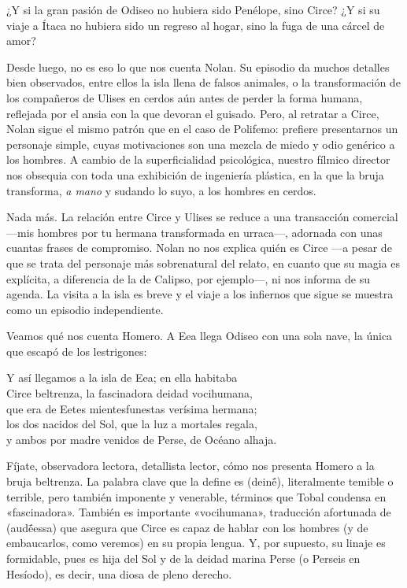 \label{cap:circe}

¿Y si la gran pasión de Odiseo no hubiera sido Penélope, sino Circe? ¿Y si su viaje a Ítaca no hubiera sido un regreso al hogar, sino la fuga de una cárcel de amor?

Desde luego, no es eso lo que nos cuenta Nolan. Su episodio da muchos detalles bien observados, entre ellos la isla llena de falsos animales, o la transformación de los compañeros de Ulises en cerdos aún antes de perder la forma humana, reflejada por el ansia con la que devoran el guisado. Pero, al retratar a Circe, Nolan sigue el mismo patrón que en el caso de Polifemo: prefiere presentarnos un personaje simple, cuyas motivaciones son una mezcla de miedo y odio genérico a los hombres. A cambio de la superficialidad psicológica, nuestro fílmico director nos obsequia con toda una exhibición de ingeniería plástica, en la que la bruja transforma, \emph{a mano} y sudando lo suyo, a los hombres en cerdos.

Nada más. La relación entre Circe y Ulises se reduce a una transacción comercial ---mis hombres por tu hermana transformada en urraca---, adornada con unas cuantas frases de compromiso. Nolan no nos explica quién es Circe ---a pesar de que se trata del personaje más sobrenatural del relato, en cuanto que su magia es explícita, a diferencia de la de Calipso, por ejemplo---, ni nos informa de su agenda. La visita a la isla es breve y el viaje a los infiernos que sigue se muestra como un episodio independiente.

Veamos qué nos cuenta Homero. A Eea llega Odiseo con una sola nave, la única que escapó de los lestrigones:

\begin{versocita}
Y así llegamos a la isla de Eea; en ella habitaba\\
Circe beltrenza, la fascinadora deidad vocihumana,\\
que era de Eetes mientesfunestas verísima hermana;\\
los dos nacidos del Sol, que la luz a mortales regala,\\
y ambos por madre venidos de Perse, de Océano alhaja.
\end{versocita}

Fíjate, observadora lectora, detallista lector, cómo nos presenta Homero a la bruja beltrenza. La palabra clave que la define es  (deinḗ), literalmente temible o terrible, pero también imponente y venerable, términos que Tobal condensa en «fascinadora». También es importante «vocihumana», traducción afortunada de  (audḗessa) que asegura que Circe es capaz de hablar con los hombres (y de embaucarlos, como veremos) en su propia lengua. Y, por supuesto, su linaje es formidable, pues es hija del Sol y de la deidad marina Perse (o Perseis en Hesíodo), es decir, una diosa de pleno derecho.

